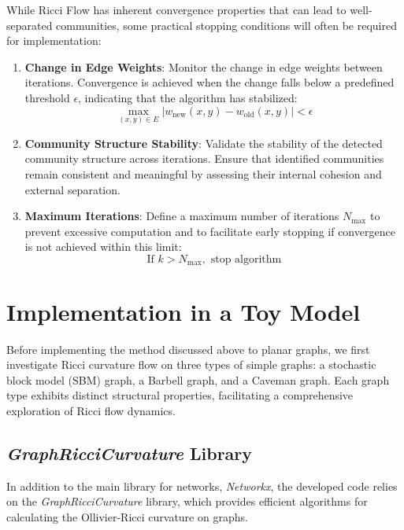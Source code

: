 \documentclass[12pt,a4paper]{article}
\begin{document}
While Ricci Flow has inherent convergence properties that can lead to well-separated communities, some practical stopping conditions will often be required for implementation:

\begin{enumerate}
    \item \textbf{Change in Edge Weights}: 
    Monitor the change in edge weights between iterations. Convergence is achieved when the change falls below a predefined threshold $\epsilon$, indicating that the algorithm has stabilized:
    \[
    \max_{(x, y) \in E} |w_{\text{new}}(x, y) - w_{\text{old}}(x, y)| < \epsilon
    \]
    
    \item \textbf{Community Structure Stability}: 
    Validate the stability of the detected community structure across iterations. Ensure that identified communities remain consistent and meaningful by assessing their internal cohesion and external separation.
    
    \item \textbf{Maximum Iterations}: 
    Define a maximum number of iterations $N_{\text{max}}$ to prevent excessive computation and to facilitate early stopping if convergence is not achieved within this limit:
    \[
    \text{If } k > N_{\text{max}}, \text{ stop algorithm}
    \]
\end{enumerate}



\newpage


\section{Implementation in a Toy Model}
Before implementing the method discussed above to planar graphs, we first investigate Ricci curvature flow on three types of simple graphs: a stochastic block model (SBM) graph, a Barbell graph, and a Caveman graph. Each graph type exhibits distinct structural properties, facilitating a comprehensive exploration of Ricci flow dynamics.

\subsection{\textit{GraphRicciCurvature} Library}
In addition to the main library for networks, \textit{Networkx}, the developed code relies on the \textit{GraphRicciCurvature} library, which provides efficient algorithms for calculating the Ollivier-Ricci curvature on graphs.
\end{document}
